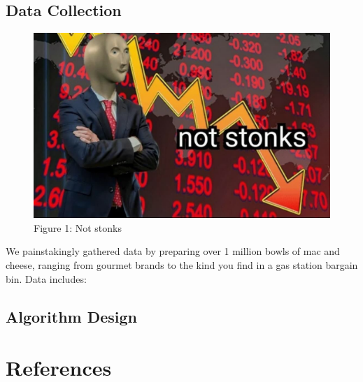 \documentclass[twocolumn]{article}
\begin{document}
\subsection{Data Collection}

\begin{figure}[h]
\begin{center}
\includegraphics[scale=0.14]{diagram-latex.jpeg} \\
Figure 1: Not stonks
\end{center}
\end{figure}

We painstakingly gathered data by preparing over 1 million bowls of mac and cheese, ranging from gourmet brands to the kind you find in a gas station bargain bin. Data includes:

\subsection{Algorithm Design}

\section{References}
\medskip
\printbibliography
\end{document}
